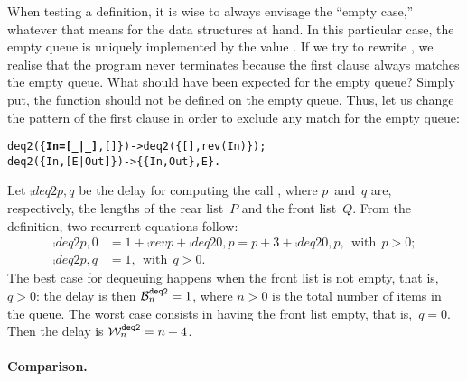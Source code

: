When testing a definition, it is wise to always envisage the ``empty
case,'' whatever that means for the data structures at hand. In this
particular case, the empty queue is uniquely implemented by the
\Erlang value \erlcode{\{[],[]\}}. If we try to rewrite
, we realise that the program never
terminates because the first clause always matches the empty
queue. What should have been expected for the empty queue? Simply put,
the function  should not be defined on the empty
queue. Thus, let us change the pattern of the first clause in order to
exclude any match for the empty queue:
\begin{alltt}
deq2(\{\textbf{In=[\_|\_]},     []\}) -> deq2(\{[],rev(In)\});
deq2(\{      In,[E|Out]\}) -> \{\{In,Out\},E\}.
\end{alltt}
Let \(\comp{deq2}{p,q}\) be the delay for computing the call
, where \(p\)~and~\(q\) are,
respectively, the lengths of the rear list~\(P\) and the front
list~\(Q\). From the definition, two recurrent equations follow:
\begin{align*}
\comp{deq2}{p,0} &= 1 + \comp{rev}{p} + \comp{deq2}{0,p}
                  = p + 3 + \comp{deq2}{0,p},\,\;
                    \text{with} \,\; p > 0;\\
\comp{deq2}{p,q} &= 1 ,\,\; \text{with} \,\; q > 0.
\end{align*}
The best case for dequeuing happens when the front list is not empty,
that is, \({q > 0}\): the delay is then \(\best{deq2}{n} = 1\), where
\({n>0}\) is the total number of items in the queue. The worst case
consists in having the front list empty, that is,~\(q=0\). Then the
delay is \(\worst{deq2}{n} = n + 4\).

\medskip

\paragraph{Comparison.}

